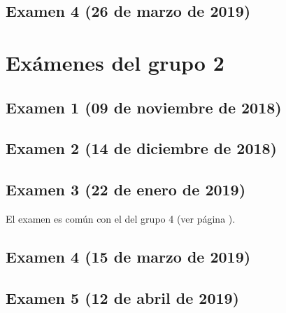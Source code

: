 \documentclass[a4paper,12pt,twoside]{book}
\begin{document}
\section{Examen 4 (26 de marzo de 2019)}

\chapter{Exámenes del grupo 2}
\section{Examen 1 (09 de noviembre de 2018)}
\section{Examen 2 (14 de diciembre de 2018)}
\section{Examen 3 (22 de enero de 2019)}
El examen es común con el del grupo 4 (ver página \pageref{examen_18_19_4_3}).
\section{Examen 4 (15 de marzo de 2019)}
\section{Examen 5 (12 de abril de 2019)}
\end{document}
